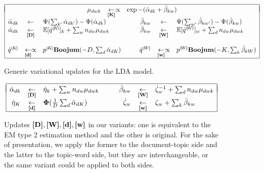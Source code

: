 \begin{figure*}
\[
\begin{array}{|rcl@{\hspace{1cm}}rcl|}
\hline
&&&&& \\[-.35cm]
\multicolumn{6}{|c|}{
\begin{array}{rcl}
\vvmDWK_{dwk} & \assign{K}\propto & \exp-(\vvmbDK_{dk}+\vvmbKW_{kw})
\end{array}
} \\
\vvmbDK_{dk} & \assignn & \Psi(\sum_{k'}\vvmDK_{dk'})-\Psi(\vvmDK_{dk}) &
\vvmbKW_{kw} & \assignn & \Psi(\sum_{w'}\vvmKW_{kw'})-\Psi(\vvmKW_{kw})\\
\vvmDK_{dk} & \assign{D} & \expectation[\cpnt{\dot{q}}{K}]_k+\sum_wn_{dw}\vvmDWK_{dwk} &
\vvmKW_{kw} & \assign{W} & \expectation[\cpnt{\dot{q}}{W}]_w+\sum_dn_{dw}\vvmDWK_{dwk} \\
&&&&& \\
\cpnt{\dot{q}}{K} & \assign{d}\propto & \cpnt{p}{K}\mbeta(-D,\sum_d\vvmbDK_{dK}) &
\cpnt{\dot{q}}{W} & \assign{w}\propto & \cpnt{p}{W}\mbeta(-K,\sum_k\vvmbKW_{kW})\\
\hline
\end{array}
\]
\caption{\label{fig:ldaupdates}Generic variational updates for the LDA model.}
\[
\begin{array}{|rcl@{\hspace{1cm}}rcl|}
\hline
&&&&& \\[-.35cm]
\vvmDK_{dk} & \assign{D} & \vvmK_k +\sum_wn_{dw}\vvmDWK_{dwk} &
\vvmKW_{kw} & \assign{W} & \vvmW_w^{-1}+\sum_dn_{dw}\vvmDWK_{dwk} \\
\vvmK_K & \assign{d} & \boldsymbol{\Phi}(\frac{1}{D}\sum_d\vvmbDK_{dK}) &
\vvmW_w & \assign{w} & \pmW_w+\sum_k\vvmbKW_{kw} \\
\hline
\end{array}
\]
\caption{\label{fig:ldaupdates-variant}Updates $\textbf{[D]},\textbf{[W]},\textbf{[d]},\textbf{[w]}$ in our variants: one is equivalent to the EM type 2 estimation method and the other is original. For the sake of presentation, we apply the former to the document-topic side and the latter to the topic-word side, but they are interchangeable, or the same variant could be applied to both sides.}
\end{figure*}
